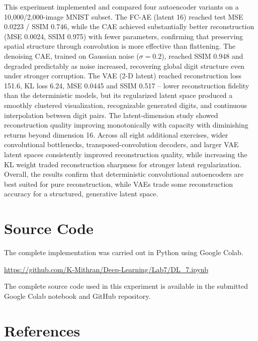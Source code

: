 \documentclass[10pt]{article}
\begin{document}
This experiment implemented and compared four autoencoder variants on a 10,000/2,000-image MNIST subset.
The FC-AE (latent 16) reached test MSE 0.0223 / SSIM 0.746, while the CAE achieved substantially better
reconstruction (MSE 0.0024, SSIM 0.975) with fewer parameters, confirming that preserving spatial
structure through convolution is more effective than flattening. The denoising CAE, trained on Gaussian
noise ($\sigma=0.2$), reached SSIM 0.948 and degraded predictably as noise increased, recovering global
digit structure even under stronger corruption. The VAE (2-D latent) reached reconstruction loss 151.6,
KL loss 6.24, MSE 0.0445 and SSIM 0.517 -- lower reconstruction fidelity than the deterministic models,
but its regularized latent space produced a smoothly clustered visualization, recognizable generated
digits, and continuous interpolation between digit pairs. The latent-dimension study showed reconstruction
quality improving monotonically with capacity with diminishing returns beyond dimension 16. Across all
eight additional exercises, wider convolutional bottlenecks, transposed-convolution decoders, and larger
VAE latent spaces consistently improved reconstruction quality, while increasing the KL weight traded
reconstruction sharpness for stronger latent regularization. Overall, the results confirm that
deterministic convolutional autoencoders are best suited for pure reconstruction, while VAEs trade some
reconstruction accuracy for a structured, generative latent space.

\section{Source Code}

The complete implementation was carried out in Python using Google Colab.

\url{https://github.com/K-Mithran/Deep-Learning/Lab7/DL_7.ipynb}

The complete source code used in this experiment is available in the submitted Google Colab notebook and
GitHub repository.

\section{References}
\end{document}
